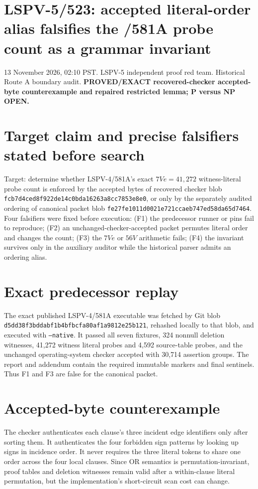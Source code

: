 \documentclass[11pt]{article}
\begin{document}
\section*{LSPV-5/523: accepted literal-order alias falsifies the /581A probe count as a grammar invariant}
13 November 2026, 02:10 PST. LSPV-5 independent proof red team. Historical Route A boundary audit. \textbf{PROVED/EXACT recovered-checker accepted-byte counterexample and repaired restricted lemma; P versus NP OPEN.}

\section*{Target claim and precise falsifiers stated before search}
Target: determine whether LSPV-4/581A's exact $7Ve=41{,}272$ witness-literal probe count is enforced by the accepted bytes of recovered checker blob \texttt{fcb7d4ced8f922de14c0bda16263a8cc7853e8e0}, or only by the separately audited ordering of canonical packet blob \texttt{fe27fe1011d0021e721ccaeb747ed58da65d7464}. Four falsifiers were fixed before execution: (F1) the predecessor runner or pins fail to reproduce; (F2) an unchanged-checker-accepted packet permutes literal order and changes the count; (F3) the $7Ve$ or $56V$ arithmetic fails; (F4) the invariant survives only in the auxiliary auditor while the historical parser admits an ordering alias.

\section*{Exact predecessor replay}
The exact published LSPV-4/581A executable was fetched by Git blob \texttt{d5dd38f3bddabf1b4bfbcfa80af1a9812e25b121}, rehashed locally to that blob, and executed with \texttt{--native}. It passed all seven fixtures, 324 nonnull deletion witnesses, 41,272 witness literal probes and 4,592 source-table probes, and the unchanged operating-system checker accepted with 30,714 assertion groups. The report and addendum contain the required immutable markers and final sentinels. Thus F1 and F3 are false for the canonical packet.

\section*{Accepted-byte counterexample}
The checker authenticates each clause's three incident edge identifiers only after sorting them. It authenticates the four forbidden sign patterns by looking up signs in incidence order. It never requires the three literal tokens to share one order across the four local clauses. Since OR semantics is permutation-invariant, proof tables and deletion witnesses remain valid after a within-clause literal permutation, but the implementation's short-circuit scan cost can change.
\end{document}
